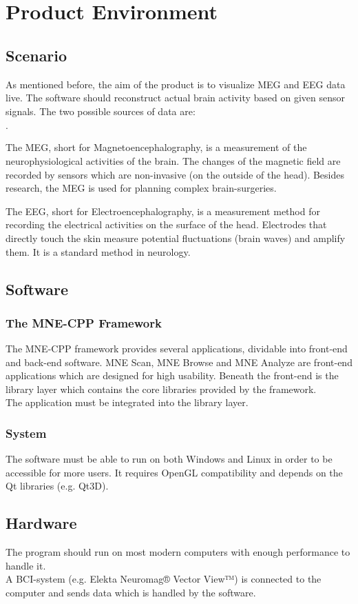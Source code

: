 \section {Product Environment}
\subsection{Scenario}
As mentioned before, the aim of the product is to visualize MEG and EEG data live. The software should reconstruct actual brain activity based on given sensor signals.
The two possible sources of data are:
\begin{list}{$\cdot$}{}

\item The MEG, short for Magnetoencephalography, is a measurement of the neurophysiological activities of the brain. The changes of the magnetic field are recorded by sensors which are non-invasive (on the outside of the head). Besides research, the MEG is used for planning complex brain-surgeries.

\item The EEG, short for Electroencephalography, is a measurement method for recording the electrical activities on the surface of the head. Electrodes that directly touch the skin measure potential fluctuations (brain waves) and amplify them. It is a standard method in neurology.
\end{list}

\subsection{Software}
\subsubsection{The MNE-CPP Framework}The MNE-CPP framework provides several applications, dividable into front-end and back-end software. MNE Scan, MNE Browse and MNE Analyze are front-end applications which are designed for high usability.
Beneath the front-end is the library layer which contains the core libraries provided by the framework.\\
The application must be integrated into the library layer.
\subsubsection{System}
The software must be able to run on both Windows and Linux in order to be accessible for more users. It requires OpenGL compatibility and depends on the Qt libraries (e.g. Qt3D).
\subsection{Hardware}
The program should run on most modern computers with enough performance to handle it. \\
A BCI-system (e.g. Elekta Neuromag® Vector View™) is connected to the computer and sends data which is handled by the software.